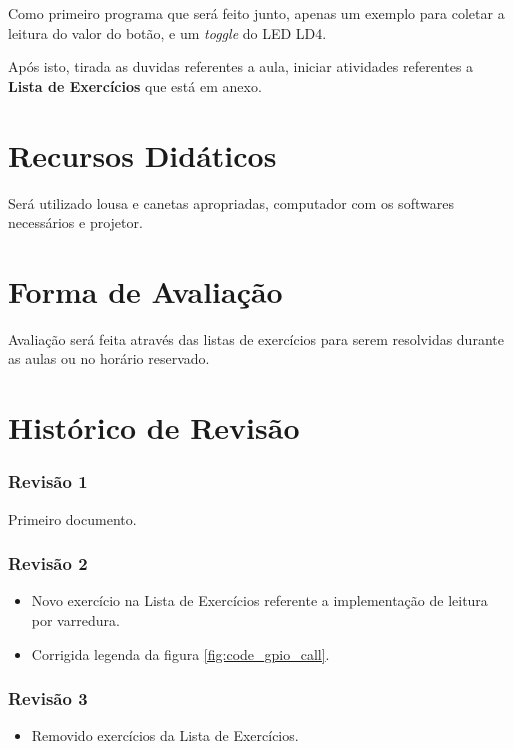 \documentclass[12pt,a4paper]{report}
\begin{document}
Como primeiro programa que será feito junto, apenas um exemplo para coletar a leitura do valor do botão, e um \textit{toggle} do LED LD4.

Após isto, tirada as duvidas referentes a aula, iniciar atividades referentes a \textbf{Lista de Exercícios} que está em anexo.

\newpage

\chapter{Recursos Didáticos}

Será utilizado lousa e canetas apropriadas, computador com os softwares necessários e projetor.

\chapter{Forma de Avaliação}

Avaliação será feita através das listas de exercícios para serem resolvidas durante as aulas ou no horário reservado.

\newpage

\chapter{Histórico de Revisão}

\subsection*{Revisão 1}

Primeiro documento.

\subsection*{Revisão 2}

\begin{itemize}
    \item Novo exercício na Lista de Exercícios referente a implementação de leitura por varredura.
    \item Corrigida legenda da figura \ref{fig:code_gpio_call}.
\end{itemize}

\subsection*{Revisão 3}

\begin{itemize}
    \item Removido exercícios da Lista de Exercícios.
\end{itemize}
\end{document}
